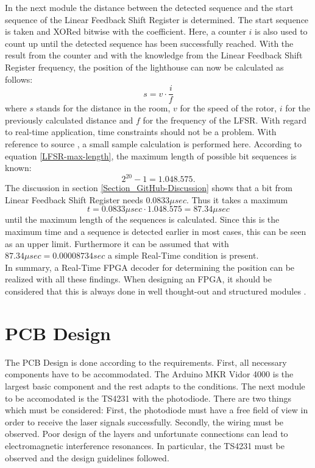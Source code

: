 \documentclass[a4paper,twoside, openright,12pt]{report}
\begin{document}
In the next module the distance between the detected sequence and the start sequence of the Linear Feedback Shift Register is determined. The start sequence is taken and XORed bitwise with the coefficient. Here, a counter $i$ is also used to count up until the detected sequence has been successfully reached. With the result from the counter and with the knowledge from the Linear Feedback Shift Register frequency, the position of the lighthouse can now be calculated as follows: 
\begin{equation}
s = v \cdot \frac{i}{f}
\end{equation}
where $s$ stands for the distance in the room, $v$ for the speed of the rotor, $i$ for the previously calculated distance and $f$ for the frequency of the LFSR. With regard to real-time application, time constraints should not be a problem. With reference to source \cite{Mishra.2016031120160312}, a small sample calculation is performed here. According to equation \ref{LFSR-max-length}, the maximum length of possible bit sequences is known: \[2^{20}-1 = 1.048.575.\]
The discussion in section \ref{Section_GitHub-Discussion} shows that a bit from Linear Feedback Shift Register needs $0.0833\mu sec$. Thus it takes a maximum \[t = 0.0833\mu sec \cdot 1.048.575 = 87.34\mu sec\] until the maximum length of the sequences is calculated. Since this is the maximum time and a sequence is detected earlier in most cases, this can be seen as an upper limit. Furthermore it can be assumed that with $87.34\mu sec = 0.00008734 sec$ a simple Real-Time condition is present. \\
In summary, a Real-Time FPGA decoder for determining the position can be realized with all these findings. When designing an FPGA, it should be considered that this is always done in well thought-out and structured modules \cite{Wakerly.2006}.


\section{PCB Design}
\label{Section_PCB}
The PCB Design is done according to the requirements. First, all necessary components have to be accommodated. The Arduino MKR Vidor 4000 is the largest basic component and the rest adapts to the conditions. The next module to be accomodated is the TS4231 with the photodiode. There are two things which must be considered: First, the photodiode must have a free field of view in order to receive the laser signals successfully. Secondly, the wiring must be observed. Poor design of the layers and unfortunate connections can lead to electromagnetic interference resonances. In particular, the TS4231 must be observed and the design guidelines \cite{TriadSemiconductor.2016} followed.
\end{document}
